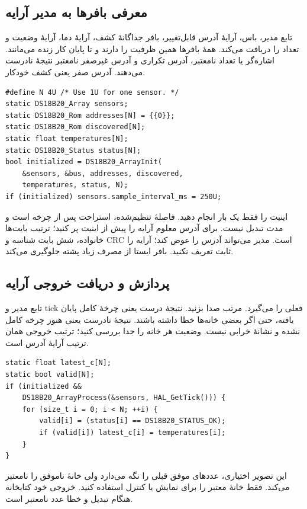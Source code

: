 \subsection{معرفی بافرها به مدیر آرایه}
تابع
مدیر، باس، آرایهٔ آدرس قابل‌تغییر، بافر جداگانهٔ کشف، آرایهٔ دما، آرایهٔ وضعیت
و تعداد را دریافت می‌کند. همهٔ بافرها همین ظرفیت را دارند و تا پایان کار زنده
می‌مانند. اشاره‌گر یا تعداد نامعتبر، آدرس تکراری و آدرس غیرصفر نامعتبر نتیجهٔ
نادرست می‌دهند. آدرس صفر یعنی کشف خودکار.
\begin{LTR}
\begin{lstlisting}
#define N 4U /* Use 1U for one sensor. */
static DS18B20_Array sensors;
static DS18B20_Rom addresses[N] = {{0}};
static DS18B20_Rom discovered[N];
static float temperatures[N];
static DS18B20_Status status[N];
bool initialized = DS18B20_ArrayInit(
    &sensors, &bus, addresses, discovered,
    temperatures, status, N);
if (initialized) sensors.sample_interval_ms = 250U;
\end{lstlisting}
\end{LTR}
اینیت را فقط یک بار انجام دهید. فاصلهٔ تنظیم‌شده، استراحت پس از چرخه است و
مدت تبدیل نیست. برای آدرس معلوم آرایه را پیش از اینیت پر کنید؛ ترتیب بایت‌ها
خانواده، شش بایت شناسه و CRC است. مدیر می‌تواند آدرس را عوض کند؛ آرایه را ثابت
تعریف نکنید. بافر ایستا از مصرف زیاد پشته جلوگیری می‌کند.

\subsection{پردازش و دریافت خروجی آرایه}
تابع
مدیر و tick فعلی را می‌گیرد. مرتب صدا بزنید. نتیجهٔ درست یعنی چرخهٔ کامل پایان
یافته، حتی اگر بعضی خانه‌ها خطا داشته باشند. نتیجهٔ نادرست یعنی هنوز چرخه کامل
نشده و نشانهٔ خرابی نیست. وضعیت هر خانه را جدا بررسی کنید؛ ترتیب خروجی همان
ترتیب آرایهٔ آدرس است.
\begin{LTR}
\begin{lstlisting}
static float latest_c[N];
static bool valid[N];
if (initialized &&
    DS18B20_ArrayProcess(&sensors, HAL_GetTick())) {
    for (size_t i = 0; i < N; ++i) {
        valid[i] = (status[i] == DS18B20_STATUS_OK);
        if (valid[i]) latest_c[i] = temperatures[i];
    }
}
\end{lstlisting}
\end{LTR}
این تصویر اختیاری، عددهای موفق قبلی را نگه می‌دارد ولی خانهٔ ناموفق را نامعتبر
می‌کند. فقط خانهٔ معتبر را برای نمایش یا کنترل استفاده کنید. خروجی خود کتابخانه
هنگام تبدیل و خطا عدد نامعتبر است.

